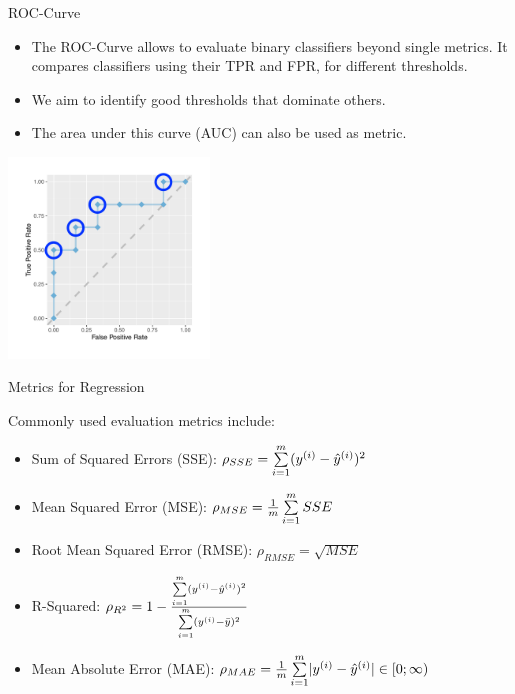 \documentclass[11pt,compress,t,notes=noshow, xcolor=table]{beamer}
\begin{document}
\begin{vbframe}{ROC-Curve}

\begin{itemize}
\item The ROC-Curve allows to evaluate binary classifiers beyond single metrics.
It compares classifiers using their TPR and FPR, for different thresholds.
\item We aim to identify good thresholds that dominate others.
\item The area under this curve (AUC) can also be used as metric.
\end{itemize}
    \begin{center}
  \includegraphics[width=0.4\textwidth,trim={1.5cm 0 0 1.5cm},clip]{figure/eval_mclass_roc_sp_4a.pdf}
\end{center}


\end{vbframe}


\begin{vbframe}{Metrics for Regression}

Commonly used evaluation metrics include:
\begin{itemize}
\item Sum of Squared Errors (SSE): $\rho_{SSE}=\sum\limits_{i=1}^m (y^{(i)}- \hat{y}^{(i)})^2$
\item Mean Squared Error (MSE): $\rho_{MSE}=\frac{1}{m} \sum\limits_{i=1}^m SSE$
\item Root Mean Squared Error (RMSE): $\rho_{RMSE}= \sqrt{MSE}$
\item R-Squared: $\rho_{R^2} = 1 - \frac{\sum\limits_{i=1}^m (y^{(i)}- \hat{y}^{(i)})^2}{\sum\limits_{i=1}^m (y^{(i)} - \bar{y})^2}$
\item Mean Absolute Error (MAE): $\rho_{MAE} = \frac{1}{m} \sum\limits_{i=1}^m \rvert y^{(i)}- \hat{y}^{(i)} \rvert \in [0;\infty) \qquad$
\end{itemize}

\end{vbframe}
\end{document}
